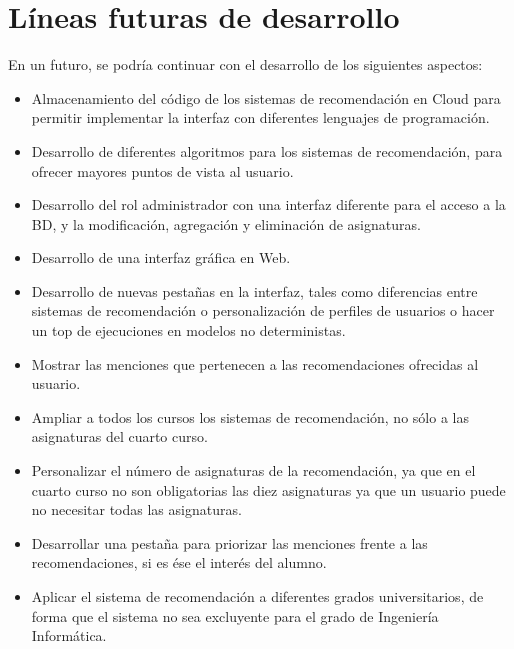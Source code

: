 \section{Líneas futuras de desarrollo}
En un futuro, se podría continuar con el desarrollo de los siguientes aspectos: 
\begin{itemize}
\item Almacenamiento del código de los sistemas de recomendación en Cloud para permitir implementar la interfaz con diferentes lenguajes de programación. 
\item Desarrollo de diferentes algoritmos para los sistemas de recomendación, para ofrecer mayores puntos de vista al usuario. 
\item Desarrollo del rol administrador con una interfaz diferente para el acceso a la BD, y la modificación, agregación y eliminación de asignaturas. 
\item Desarrollo de una interfaz gráfica en Web. 
\item Desarrollo de  nuevas pestañas en la interfaz, tales como diferencias entre sistemas de recomendación o personalización de perfiles de usuarios o hacer un top de ejecuciones en modelos no deterministas. 
\item Mostrar  las menciones que pertenecen a las  recomendaciones ofrecidas al usuario. 
\item Ampliar a todos los cursos los sistemas de recomendación, no sólo a las asignaturas del cuarto curso. 
\item Personalizar el número de asignaturas de la recomendación, ya que en el cuarto curso no son obligatorias las diez asignaturas ya que un usuario puede no necesitar todas las asignaturas. 
\item Desarrollar una pestaña para priorizar las menciones frente a las recomendaciones, si es ése el interés del alumno. 
\item Aplicar el sistema de recomendación a diferentes grados universitarios, de forma que el sistema no sea excluyente para el grado de Ingeniería Informática. 
\end{itemize}